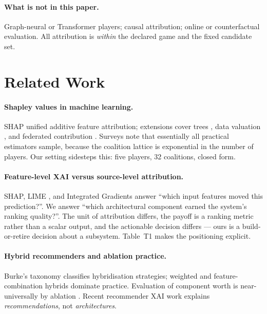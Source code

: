 \documentclass[11pt]{article}
\begin{document}
\paragraph{What is not in this paper.} Graph-neural or Transformer players;
causal attribution; online or counterfactual evaluation. All attribution is
\emph{within} the declared game and the fixed candidate set.

\section{Related Work}

\paragraph{Shapley values in machine learning.}
SHAP \citep{lundberg2017} unified additive feature attribution; extensions
cover trees \citep{lundberg2020}, data valuation \citep{ghorbani2019}, and
federated contribution \citep{wang2020federated}. Surveys
\citep{covert2021explaining, rozemberczki2022shapley} note that essentially all
practical estimators sample, because the coalition lattice is exponential in
the number of players. Our setting sidesteps this: five players, 32
coalitions, closed form.

\paragraph{Feature-level XAI versus source-level attribution.}
SHAP, LIME \citep{ribeiro2016}, and Integrated Gradients
\citep{sundararajan2017} answer ``which input features moved this
prediction?''. We answer ``which architectural component earned the system's
ranking quality?''. The unit of attribution differs, the payoff is a ranking
metric rather than a scalar output, and the actionable decision differs ---
ours is a build-or-retire decision about a subsystem. Table~T1 makes the
positioning explicit.

\paragraph{Hybrid recommenders and ablation practice.}
Burke's taxonomy \citep{burke2002hybrid} classifies hybridisation strategies;
weighted and feature-combination hybrids dominate practice. Evaluation of
component worth is near-universally by ablation \citep{zangerle2022evaluating}.
Recent recommender XAI work \citep{zhang2020explainable} explains
\emph{recommendations}, not \emph{architectures}.
\end{document}
